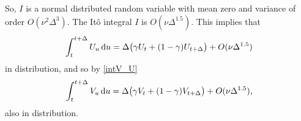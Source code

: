 \documentclass{ws-ijfe}
\begin{document}
So, $I$ is a normal distributed random variable with mean zero and variance of order $O(\nu^2\Delta^{3})$. The It\^o integral $I$ is $O(\nu\Delta^{1.5})$.
This implies that
\begin{equation*}
   \int_{t}^{t+\Delta}U_u\,\mathrm{d} u = \Delta\big(\gamma U_t+(1-\gamma) U_{t+\Delta}\big)+O(\nu\Delta^{1.5})
\end{equation*}
in distribution, and so by \eqref{intV_U}
\begin{equation*}
    \int_{t}^{t+\Delta}V_u\,\mathrm{d} u=\Delta\big(\gamma V_t+(1-\gamma) V_{t+\Delta}\big)+O(\nu\Delta^{1.5}),
\end{equation*}
also in distribution.
\end{document}
